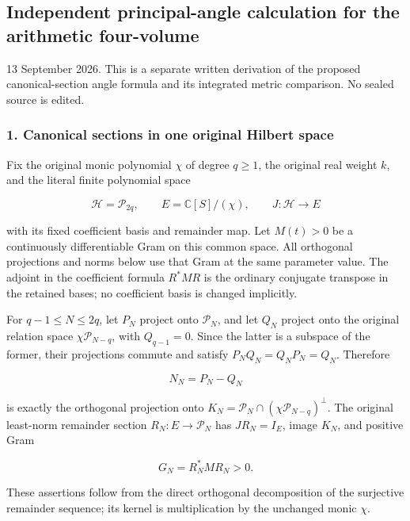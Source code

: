 \subsection{Independent principal-angle calculation for the arithmetic four-volume}\label{endpoint-principal_angle_volume_review--independent-principal-angle-calculation-for-the-arithmetic-four-volume}

13 September 2026. This is a separate written derivation of the proposed canonical-section angle formula and its integrated metric comparison. No sealed source is edited.

\subsubsection{1. Canonical sections in one original Hilbert space}\label{endpoint-principal_angle_volume_review--canonical-sections-in-one-original-hilbert-space}

Fix the original monic polynomial \(\chi\) of degree \(q\ge1\), the original real weight \(k\), and the literal finite polynomial space

\[
\mathcal H=\mathcal P_{2q},\qquad
E=\mathbb C[S]/(\chi),\qquad
J:\mathcal H\longrightarrow E
\tag{PA1}
\]

with its fixed coefficient basis and remainder map. Let \(M(t)>0\) be a continuously differentiable Gram on this common space. All orthogonal projections and norms below use that Gram at the same parameter value. The adjoint in the coefficient formula \(R^*MR\) is the ordinary conjugate transpose in the retained bases; no coefficient basis is changed implicitly.

For \(q-1\le N\le2q\), let \(P_N\) project onto \(\mathcal P_N\), and let \(Q_N\) project onto the original relation space \(\chi\mathcal P_{N-q}\), with \(Q_{q-1}=0\). Since the latter is a subspace of the former, their projections commute and satisfy \(P_NQ_N=Q_NP_N=Q_N\). Therefore

\[
N_N=P_N-Q_N
\tag{PA2}
\]

is exactly the orthogonal projection onto \(K_N=\mathcal P_N\cap(\chi\mathcal P_{N-q})^\perp\). The original least-norm remainder section \(R_N:E\to\mathcal P_N\) has \(JR_N=I_E\), image \(K_N\), and positive Gram

\[
G_N=R_N^*MR_N>0.
\tag{PA3}
\]

These assertions follow from the direct orthogonal decomposition of the surjective remainder sequence; its kernel is multiplication by the unchanged monic \(\chi\).

